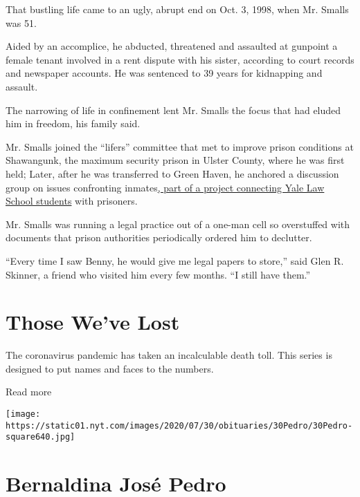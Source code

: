 That bustling life came to an ugly, abrupt end on Oct. 3, 1998, when Mr.
Smalls was 51.

Aided by an accomplice, he abducted, threatened and assaulted at
gunpoint a female tenant involved in a rent dispute with his sister,
according to court records and newspaper accounts. He was sentenced to
39 years for kidnapping and assault.

The narrowing of life in confinement lent Mr. Smalls the focus that had
eluded him in freedom, his family said.

Mr. Smalls joined the ``lifers'' committee that met to improve prison
conditions at Shawangunk, the maximum security prison in Ulster County,
where he was first held; Later, after he was transferred to Green Haven,
he anchored a discussion group on issues confronting
inmates\href{https://law.yale.edu/student-life/student-journals-organizations/student-organizations/green-haven-prison-project}{,
part of a project connecting Yale Law School students} with prisoners.

Mr. Smalls was running a legal practice out of a one-man cell so
overstuffed with documents that prison authorities periodically ordered
him to declutter.

``Every time I saw Benny, he would give me legal papers to store,'' said
Glen R. Skinner, a friend who visited him every few months. ``I still
have them.''

\href{https://www.nytimes.com/interactive/2020/obituaries/people-died-coronavirus-obituaries.html?action=click\&pgtype=Article\&state=default\&region=BELOW_MAIN_CONTENT\&context=covid_obits_promo}{}

\hypertarget{those-weve-lost}{%
\section{Those We've Lost}\label{those-weve-lost}}

The coronavirus pandemic has taken an incalculable death toll. This
series is designed to put names and faces to the numbers.

Read more

\texttt{[image: https://static01.nyt.com/images/2020/07/30/obituaries/30Pedro/30Pedro-square640.jpg]}

\hypertarget{bernaldina-josuxe9-pedro}{%
\section{Bernaldina José Pedro}\label{bernaldina-josuxe9-pedro}}

